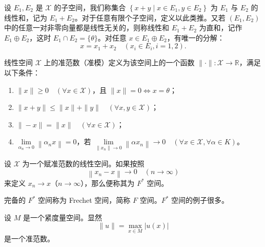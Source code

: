 \documentclass[lang=cn,newtx,10pt,scheme=chinese,thmcnt=chapter]{elegantbook}
\begin{document}
\begin{definition}[线性和与直和]
设 $E_1, E_2$ 是 $\mathscr{X}$ 的子空间，我们称集合 $\left\{x + y \mid x \in E_1, y \in E_2\right\}$ 为 $E_1$ 与 $E_2$ 的线性和，记为 $E_1 + E_2$。对于任意有限个子空间，定义以此类推。又若 $(E_1, E_2)$ 中的任意一对非零向量都是线性无关的，则称线性和 $E_1 + E_2$ 为直和，记作 $E_1 \oplus E_2$，这时 $E_1 \cap E_2 = \{\theta\}$。对任意 $x \in E_1 \oplus E_2$，有唯一的分解：
\[
x = x_1 + x_2 \quad (x_i \in E_i, i = 1, 2).
\]
\end{definition}
\begin{definition}
线性空间 $\mathscr{X}$ 上的准范数（准模）定义为该空间上的一个函数 $\|\cdot\|: \mathscr{X} \rightarrow \mathbb{R}$，满足以下条件：
\begin{enumerate}
  \item $\|x\| \geqslant 0 \quad (\forall x \in \mathscr{X})$，且 $\|x\| = 0 \Longleftrightarrow x = \theta$；
  \item $\|x + y\| \leqslant \|x\| + \|y\| \quad (\forall x, y \in \mathscr{X})$；
  \item $\|-x\| = \|x\| \quad (\forall x \in \mathscr{X})$；
  \item $\lim\limits_{\alpha_n \to 0} \left\|\alpha_n x\right\| = 0$，若  $\lim\limits_{\|x_n\|\to 0}\left\|\alpha x_n\right\| \to 0 \quad (\forall x \in \mathscr{X}, \forall \alpha \in K)$。
\end{enumerate}
\end{definition}


\begin{definition}
设 $\mathscr{X}$ 为一个赋准范数的线性空间。如果按照
\[
\left\| x_n - x \right\| \to 0 \quad (n \to \infty)
\]
来定义 $x_n \to x$（$n \to \infty$），那么便称其为 $F^*$ 空间。
\end{definition}


\begin{definition}
完备的 $F^*$ 空间称为 Frechet 空间，简称 $F$ 空间。$F^*$ 空间的例子很多。
\end{definition}


\begin{example}
设 $M$ 是一个紧度量空间。显然
\[
\|u\| = \max_{x \in M} |u(x)|
\]
是一个准范数。
\end{example}
\end{document}
